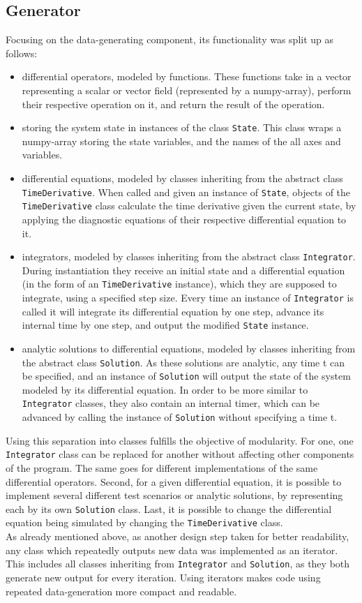 \subsection*{Generator}
Focusing on the data-generating component, its functionality was split up as follows:
\begin{itemize}
\item differential operators, modeled by functions. 
These functions take in a vector representing a scalar or vector field (represented by a numpy-array), perform their respective operation on it, and return the result of the operation.
\item storing the system state in instances of the class \texttt{State}.
This class wraps a numpy-array storing the state variables, and the names of the all axes and variables.
\item differential equations, modeled by classes inheriting from the abstract class \texttt{TimeDerivative}.
When called and given an instance of \texttt{State}, objects of the \texttt{TimeDerivative} class calculate the time derivative given the current state, by applying the diagnostic equations of their respective differential equation to it.
\item integrators, modeled by classes inheriting from the abstract class \texttt{Integrator}.
During instantiation they receive an initial state and a differential equation (in the form of an \texttt{TimeDerivative} instance), which they are supposed to integrate, using a specified step size.
Every time an instance of \texttt{Integrator} is called it will integrate its differential equation by one step, advance its internal time by one step, and output the modified \texttt{State} instance.
\item analytic solutions to differential equations, modeled by classes inheriting from the abstract class \texttt{Solution}.
As these solutions are analytic, any time t can be specified, and an instance of \texttt{Solution} will output the state of the system modeled by its differential equation.
In order to be more similar to \texttt{Integrator} classes, they also contain an internal timer, which can be advanced by calling the instance of \texttt{Solution} without specifying a time t.
\end{itemize}
Using this separation into classes fulfills the objective of modularity.
For one, one \texttt{Integrator} class can be replaced for another without affecting other components of the program.
The same goes for different implementations of the same differential operators.
Second, for a given differential equation, it is possible to implement several different test scenarios or analytic solutions, by representing each by its own \texttt{Solution} class.
Last, it is possible to change the differential equation being simulated by changing the \texttt{TimeDerivative} class.
\\
As already mentioned above, as another design step taken for better readability, any class which repeatedly outputs new data was implemented as an iterator.
This includes all classes inheriting from \texttt{Integrator} and \texttt{Solution}, as they both generate new output for every iteration.
Using iterators makes code using repeated data-generation more compact and readable.


